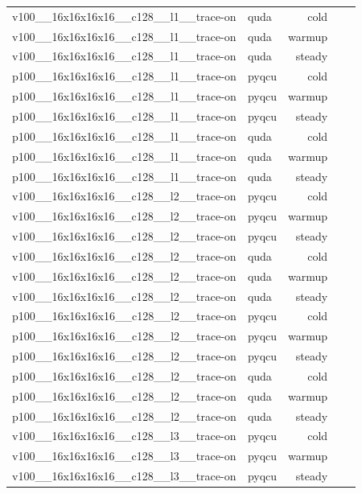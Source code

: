 \begin{table}[htbp]
\begin{tabular}{@{}llrrr@{}}
v100\_\_16x16x16x16\_\_c128\_\_l1\_\_trace-on & quda & cold &  &  \\
v100\_\_16x16x16x16\_\_c128\_\_l1\_\_trace-on & quda & warmup &  &  \\
v100\_\_16x16x16x16\_\_c128\_\_l1\_\_trace-on & quda & steady &  &  \\
p100\_\_16x16x16x16\_\_c128\_\_l1\_\_trace-on & pyqcu & cold &  &  \\
p100\_\_16x16x16x16\_\_c128\_\_l1\_\_trace-on & pyqcu & warmup &  &  \\
p100\_\_16x16x16x16\_\_c128\_\_l1\_\_trace-on & pyqcu & steady &  &  \\
p100\_\_16x16x16x16\_\_c128\_\_l1\_\_trace-on & quda & cold &  &  \\
p100\_\_16x16x16x16\_\_c128\_\_l1\_\_trace-on & quda & warmup &  &  \\
p100\_\_16x16x16x16\_\_c128\_\_l1\_\_trace-on & quda & steady &  &  \\
v100\_\_16x16x16x16\_\_c128\_\_l2\_\_trace-on & pyqcu & cold &  &  \\
v100\_\_16x16x16x16\_\_c128\_\_l2\_\_trace-on & pyqcu & warmup &  &  \\
v100\_\_16x16x16x16\_\_c128\_\_l2\_\_trace-on & pyqcu & steady &  &  \\
v100\_\_16x16x16x16\_\_c128\_\_l2\_\_trace-on & quda & cold &  &  \\
v100\_\_16x16x16x16\_\_c128\_\_l2\_\_trace-on & quda & warmup &  &  \\
v100\_\_16x16x16x16\_\_c128\_\_l2\_\_trace-on & quda & steady &  &  \\
p100\_\_16x16x16x16\_\_c128\_\_l2\_\_trace-on & pyqcu & cold &  &  \\
p100\_\_16x16x16x16\_\_c128\_\_l2\_\_trace-on & pyqcu & warmup &  &  \\
p100\_\_16x16x16x16\_\_c128\_\_l2\_\_trace-on & pyqcu & steady &  &  \\
p100\_\_16x16x16x16\_\_c128\_\_l2\_\_trace-on & quda & cold &  &  \\
p100\_\_16x16x16x16\_\_c128\_\_l2\_\_trace-on & quda & warmup &  &  \\
p100\_\_16x16x16x16\_\_c128\_\_l2\_\_trace-on & quda & steady &  &  \\
v100\_\_16x16x16x16\_\_c128\_\_l3\_\_trace-on & pyqcu & cold &  &  \\
v100\_\_16x16x16x16\_\_c128\_\_l3\_\_trace-on & pyqcu & warmup &  &  \\
v100\_\_16x16x16x16\_\_c128\_\_l3\_\_trace-on & pyqcu & steady &  &  \\

\end{tabular}
\end{table}
